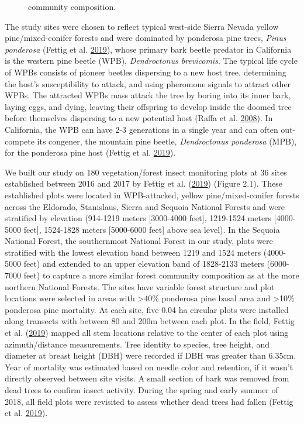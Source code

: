 \documentclass[twoside,12pt,final]{ucthesis-CA2012}
\begin{document}
\begin{ucmainmatter}
\begin{figure}
{community composition.}
\end{figure}
The study sites were chosen to reflect typical west-side Sierra Nevada
yellow pine/mixed-conifer forests and were dominated by ponderosa pine
trees, \emph{Pinus ponderosa} (Fettig et al.
\protect\hyperlink{ref-fettig2019}{2019}), whose primary bark beetle
predator in California is the western pine beetle (WPB),
\emph{Dendroctonus brevicomis}. The typical life cycle of WPBs consists
of pioneer beetles dispersing to a new host tree, determining the host's
susceptibility to attack, and using pheromone signals to attract other
WPBs. The attracted WPBs mass attack the tree by boring into its inner
bark, laying eggs, and dying, leaving their offspring to develop inside
the doomed tree before themselves dispersing to a new potential host
(Raffa et al. \protect\hyperlink{ref-raffa2008}{2008}). In California,
the WPB can have 2-3 generations in a single year and can often
out-compete its congener, the mountain pine beetle, \emph{Dendroctonus
ponderosa} (MPB), for the ponderosa pine host (Fettig et al.
\protect\hyperlink{ref-fettig2019}{2019}).

We built our study on 180 vegetation/forest insect monitoring plots at
36 sites established between 2016 and 2017 by Fettig et al.
(\protect\hyperlink{ref-fettig2019}{2019}) (Figure 2.1). These
established plots were located in WPB-attacked, yellow
pine/mixed-conifer forests across the Eldorado, Stanislaus, Sierra and
Sequoia National Forests and were stratified by elevation (914-1219
meters {[}3000-4000 feet{]}, 1219-1524 meters {[}4000-5000 feet{]},
1524-1828 meters {[}5000-6000 feet{]} above sea level). In the Sequoia
National Forest, the southernmost National Forest in our study, plots
were stratified with the lowest elevation band between 1219 and 1524
meters (4000-5000 feet) and extended to an upper elevation band of
1828-2133 meters (6000-7000 feet) to capture a more similar forest
community composition as at the more northern National Forests. The
sites have variable forest structure and plot locations were selected in
areas with \textgreater{}40\% ponderosa pine basal area and
\textgreater{}10\% ponderosa pine mortality. At each site, five 0.04 ha
circular plots were installed along transects with between 80 and 200m
between each plot. In the field, Fettig et al.
(\protect\hyperlink{ref-fettig2019}{2019}) mapped all stem locations
relative to the center of each plot using azimuth/distance measurements.
Tree identity to species, tree height, and diameter at breast height
(DBH) were recorded if DBH was greater than 6.35cm. Year of mortality
was estimated based on needle color and retention, if it wasn't directly
observed between site visits. A small section of bark was removed from
dead trees to confirm insect activity. During the spring and early
summer of 2018, all field plots were revisited to assess whether dead
trees had fallen (Fettig et al.
\protect\hyperlink{ref-fettig2019}{2019}).


\end{ucmainmatter}
\end{document}
